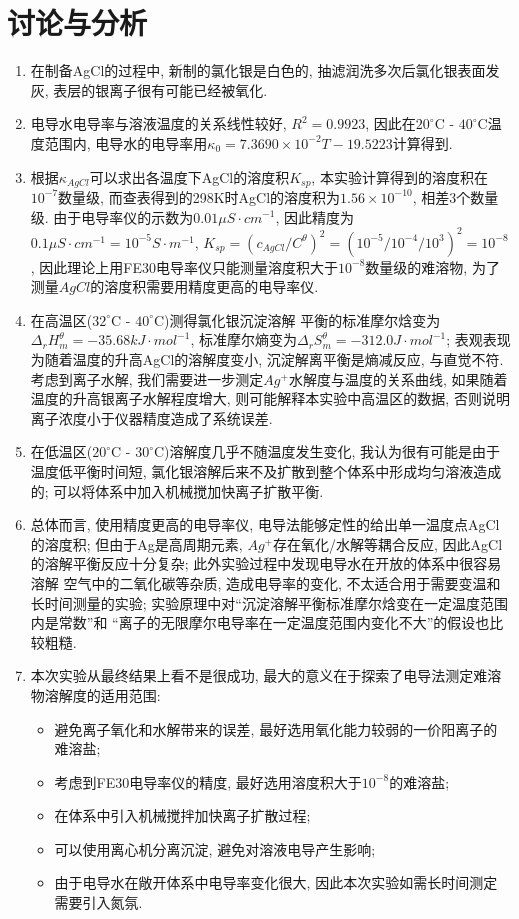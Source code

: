 \documentclass[a4paper]{article}
\begin{document}
\section{讨论与分析}
\begin{enumerate}
	\item 在制备AgCl的过程中, 新制的氯化银是白色的, 
	抽滤润洗多次后氯化银表面发灰, 表层的银离子很有可能已经被氧化.
	\item 电导水电导率与溶液温度的关系线性较好, $R^{2} = 0.9923$, 因此在$20^\circ$C - $40^\circ$C温度范围内, 
	电导水的电导率用$\kappa_{0} = 7.3690\times 10^{-2}T - 19.5223$计算得到.
	\item 根据$\kappa_{AgCl}$可以求出各温度下AgCl的溶度积$K_{sp}$, 
	本实验计算得到的溶度积在$10^{-7}$数量级, 而查表得到的298K时AgCl的溶度积为$1.56\times 10^{-10}$, 
	相差3个数量级. 由于电导率仪的示数为$0.01 \mu S\cdot cm^{-1}$, 
	因此精度为$0.1 \mu S\cdot cm^{-1} = 10^{-5} S\cdot m^{-1}$, 
	$K_{sp} = (c_{AgCl}/C^{\theta})^{2} = (10^{-5} / 10^{-4} / 10^{3})^{2} = 10^{-8}$, 
	因此理论上用FE30电导率仪只能测量溶度积大于$10^{-8}$数量级的难溶物, 
	为了测量$AgCl$的溶度积需要用精度更高的电导率仪. 
	\item 在高温区($32^\circ$C - $40^\circ$C)测得氯化银沉淀溶解
	平衡的标准摩尔焓变为$\Delta_{r}H^{\theta}_{m} = -35.68 kJ\cdot mol^{-1}$, 
	标准摩尔熵变为$\Delta_{r}S^{\theta}_{m} = -312.0 J\cdot mol^{-1}$; 
	表观表现为随着温度的升高AgCl的溶解度变小, 沉淀解离平衡是熵减反应, 与直觉不符.\\
	考虑到离子水解, 我们需要进一步测定$Ag^{+}$水解度与温度的关系曲线, 
	如果随着温度的升高银离子水解程度增大, 则可能解释本实验中高温区的数据,
	否则说明离子浓度小于仪器精度造成了系统误差.
	\item 在低温区($20^\circ$C - $30^\circ$C)溶解度几乎不随温度发生变化, 
	我认为很有可能是由于温度低平衡时间短, 氯化银溶解后来不及扩散到整个体系中形成均匀溶液造成的; 
	可以将体系中加入机械搅加快离子扩散平衡.
	\item 总体而言, 使用精度更高的电导率仪, 电导法能够定性的给出单一温度点AgCl的溶度积; 
	但由于Ag是高周期元素, $Ag^{+}$存在氧化/水解等耦合反应, 因此AgCl的溶解平衡反应十分复杂; 
	此外实验过程中发现电导水在开放的体系中很容易溶解
	空气中的二氧化碳等杂质, 造成电导率的变化, 不太适合用于需要变温和长时间测量的实验; 
	实验原理中对``沉淀溶解平衡标准摩尔焓变在一定温度范围内是常数''和
	``离子的无限摩尔电导率在一定温度范围内变化不大''的假设也比较粗糙.
	\item 本次实验从最终结果上看不是很成功, 
	最大的意义在于探索了电导法测定难溶物溶解度的适用范围:
	\begin{itemize}
		\item 避免离子氧化和水解带来的误差, 最好选用氧化能力较弱的一价阳离子的难溶盐;
		\item 考虑到FE30电导率仪的精度, 最好选用溶度积大于$10^{-8}$的难溶盐;
		\item 在体系中引入机械搅拌加快离子扩散过程;
		\item 可以使用离心机分离沉淀, 避免对溶液电导产生影响;
		\item 由于电导水在敞开体系中电导率变化很大, 因此本次实验如需长时间测定需要引入氮氛.
	\end{itemize}
\end{enumerate}
\newpage
\end{document}
